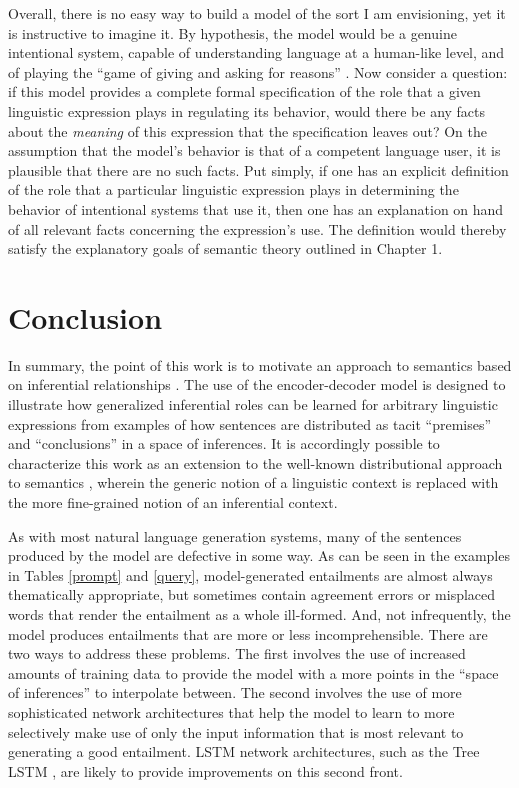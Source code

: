 Overall, there is no easy way to build a model of the sort I am envisioning, yet it is instructive to imagine it. By hypothesis, the model would be a genuine intentional system, capable of understanding language at a human-like level, and of playing the ``game of giving and asking for reasons'' \citep{Brandom:1994}. Now consider a question: if this model provides a complete formal specification of the role that a given linguistic expression plays in regulating its behavior, would there be any facts about the \textit{meaning} of this expression that the specification leaves out? On the assumption that the model's behavior is that of a competent language user, it is plausible that there are no such facts. Put simply, if one has an explicit definition of the role that a particular linguistic expression plays in determining the behavior of intentional systems that use it, then one has an explanation on hand of all relevant facts concerning the expression's use. The definition would thereby satisfy the explanatory goals of semantic theory outlined in Chapter 1. 

\section{Conclusion}

In summary, the point of this work is to motivate an approach to semantics based on inferential relationships \citep{Brandom:1994}. The use of the encoder-decoder model is designed to illustrate how generalized inferential roles can be learned for arbitrary linguistic expressions from examples of how sentences are distributed as tacit ``premises'' and ``conclusions'' in a space of inferences. It is accordingly possible to characterize this work as an extension to the well-known distributional approach to semantics \citep{TurneyPantel:2010}, wherein the generic notion of a linguistic context is replaced with the more fine-grained notion of an inferential context. 

As with most natural language generation systems, many of the sentences produced by the model are defective in some way. As can be seen in the examples in Tables \ref{prompt} and \ref{query}, model-generated entailments are almost always thematically appropriate, but sometimes contain agreement errors or misplaced words that render the entailment as a whole ill-formed. And, not infrequently, the model produces entailments that are more or less incomprehensible. There are two ways to address these problems. The first involves the use of increased amounts of training data to provide the model with a more points in the ``space of inferences'' to interpolate between. The second involves the use of more sophisticated network architectures that help the model to learn to more selectively make use of only the input information that is most relevant to generating a good entailment. LSTM network architectures, such as the Tree LSTM \citep{Tai:2015}, are likely to provide improvements on this second front. 

